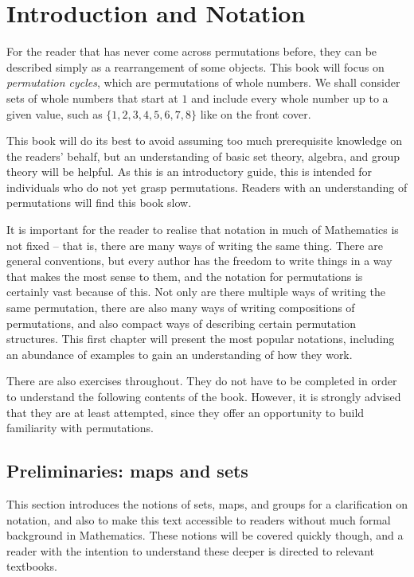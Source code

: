 \section{Introduction and Notation}\label{sec:intro}

For the reader that has never come across permutations before, they can be described simply as a rearrangement of some objects. This book will focus on \textit{permutation cycles}, which are permutations of whole numbers. We shall consider sets of whole numbers that start at \(1\) and include every whole number up to a given value, such as \(\{1, 2, 3, 4, 5, 6, 7, 8\}\) like on the front cover.

This book will do its best to avoid assuming too much prerequisite knowledge on the readers' behalf, but an understanding of basic set theory, algebra, and group theory will be helpful. As this is an introductory guide, this is intended for individuals who do not yet grasp permutations. Readers with an understanding of permutations will find this book slow.

It is important for the reader to realise that notation in much of Mathematics is not fixed -- that is, there are many ways of writing the same thing. There are general conventions, but every author has the freedom to write things in a way that makes the most sense to them, and the notation for permutations is certainly vast because of this. Not only are there multiple ways of writing the same permutation, there are also many ways of writing compositions of permutations, and also compact ways of describing certain permutation structures. This first chapter will present the most popular notations, including an abundance of examples to gain an understanding of how they work.

There are also exercises throughout. They do not have to be completed in order to understand the following contents of the book. However, it is strongly advised that they are at least attempted, since they offer an opportunity to build familiarity with permutations.


\subsection{Preliminaries: maps and sets}

This section introduces the notions of sets, maps, and groups for a clarification on notation, and also to make this text accessible to readers without much formal background in Mathematics. These notions will be covered quickly though, and a reader with the intention to understand these deeper is directed to relevant textbooks.

